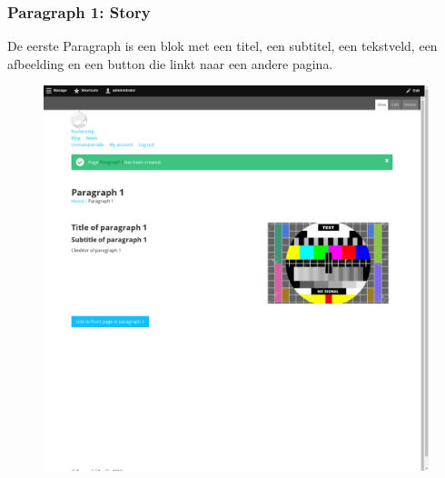 \subsubsection{Paragraph 1: Story}
De eerste Paragraph is een blok met een titel, een subtitel, een tekstveld, een afbeelding en een button die linkt naar een andere pagina.
\begin{figure}[h]
\includegraphics[width=1\textwidth]{img/p001.png}
\end{figure}

\clearpage
